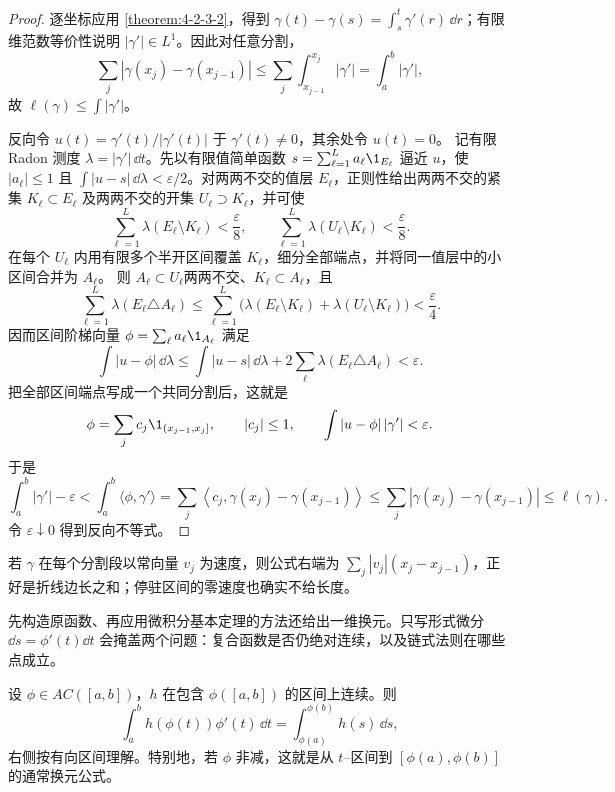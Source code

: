 \begin{proof}
逐坐标应用 \cref{theorem:4-2-3-2}，得到
$\gamma(t)-\gamma(s)=\int_s^t\gamma'(r)\,\dd r$；有限维范数等价性说明
$|\gamma'|\in L^1$。因此对任意分割，
\[
 \sum_j|\gamma(x_j)-\gamma(x_{j-1})|
 \le\sum_j\int_{x_{j-1}}^{x_j}|\gamma'|
 =\int_a^b|\gamma'|,
\]
故 $\ell(\gamma)\le\int|\gamma'|$。

反向令 $u(t)=\gamma'(t)/|\gamma'(t)|$ 于 $\gamma'(t)\ne0$，其余处令 $u(t)=0$。
记有限 Radon 测度 $\lambda=|\gamma'|\,\dd t$。先以有限值简单函数
$s=\sum_{\ell=1}^La_\ell\1_{E_\ell}$ 逼近 $u$，使 $|a_\ell|\le1$ 且
$\int|u-s|\,\dd\lambda<\varepsilon/2$。对两两不交的值层 $E_\ell$，正则性给出两两不交的紧集
$K_\ell\subset E_\ell$ 及两两不交的开集 $U_\ell\supset K_\ell$，并可使
\[
 \sum_{\ell=1}^L\lambda(E_\ell\setminus K_\ell)<\frac\varepsilon8,
 \qquad
 \sum_{\ell=1}^L\lambda(U_\ell\setminus K_\ell)<\frac\varepsilon8.
\]
在每个 $U_\ell$ 内用有限多个半开区间覆盖 $K_\ell$，细分全部端点，并将同一值层中的小区间合并为 $A_\ell$。
则 $A_\ell\subset U_\ell$两两不交、$K_\ell\subset A_\ell$，且
\[
 \sum_{\ell=1}^L\lambda(E_\ell\triangle A_\ell)
 \le\sum_{\ell=1}^L
 \bigl(\lambda(E_\ell\setminus K_\ell)+\lambda(U_\ell\setminus K_\ell)\bigr)
 <\frac\varepsilon4.
\]
因而区间阶梯向量 $\phi=\sum_\ell a_\ell\1_{A_\ell}$ 满足
\[
 \int|u-\phi|\,\dd\lambda
 \le\int|u-s|\,\dd\lambda
    +2\sum_\ell\lambda(E_\ell\triangle A_\ell)<\varepsilon.
\]
把全部区间端点写成一个共同分割后，这就是
\[
 \phi=\sum_jc_j\1_{(x_{j-1},x_j]},\qquad |c_j|\le1,\qquad
 \int|u-\phi|\,|\gamma'|<\varepsilon.
\]
于是
\[
 \int_a^b|\gamma'|-\varepsilon
 <\int_a^b\langle\phi,\gamma'\rangle
 =\sum_j\left\langle c_j,
   \gamma(x_j)-\gamma(x_{j-1})\right\rangle
 \le\sum_j|\gamma(x_j)-\gamma(x_{j-1})|
 \le\ell(\gamma).
\]
令 $\varepsilon\downarrow0$ 得到反向不等式。
\end{proof}

若 $\gamma$ 在每个分割段以常向量 $v_j$ 为速度，则公式右端为
$\sum_j|v_j|(x_j-x_{j-1})$，正好是折线边长之和；停驻区间的零速度也确实不给长度。

先构造原函数、再应用微积分基本定理的方法还给出一维换元。只写形式微分
$\dd s=\phi'(t)\dd t$ 会掩盖两个问题：复合函数是否仍绝对连续，以及链式法则在哪些点成立。

\begin{proposition}[绝对连续参数下的一维换元]\label{proposition:4-2-3-change-of-variables}
设 $\phi\in AC([a,b])$，$h$ 在包含 $\phi([a,b])$ 的区间上连续。则
\[
 \int_a^b h(\phi(t))\phi'(t)\,\dd t
 =\int_{\phi(a)}^{\phi(b)}h(s)\,\dd s,
\]
右侧按有向区间理解。特别地，若 $\phi$ 非减，这就是从 $t$--区间到
$[\phi(a),\phi(b)]$ 的通常换元公式。
\end{proposition}

